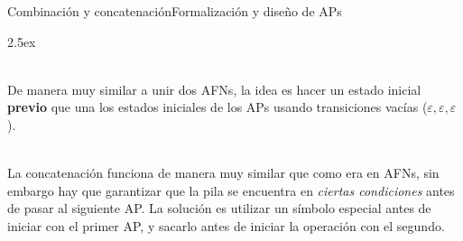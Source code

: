 \documentclass[spanish, handout]{beamer}
\begin{document}
\begin{frame}{Combinación y concatenación}{Formalización y diseño de APs}
    \begin{description}
        \itemsep2.5ex
        \item[Combinación de APs] \hfill \\
        De manera muy similar a unir dos AFNs, la idea es hacer un estado inicial \textbf{previo} que una los estados iniciales de los APs usando transiciones vacías ($\varepsilon,\varepsilon,\varepsilon$). \pause
        \item[Concatenación de APs]  \hfill \\
        La concatenación funciona de manera muy similar que como era en AFNs, sin embargo hay que garantizar que la pila se encuentra en \textit{ciertas condiciones} antes de pasar al siguiente AP.
        La solución es utilizar un símbolo especial antes de iniciar con el primer AP, y sacarlo antes de iniciar la operación con el segundo.
    \end{description}
    
\end{frame}

% 
% 
\end{document}
